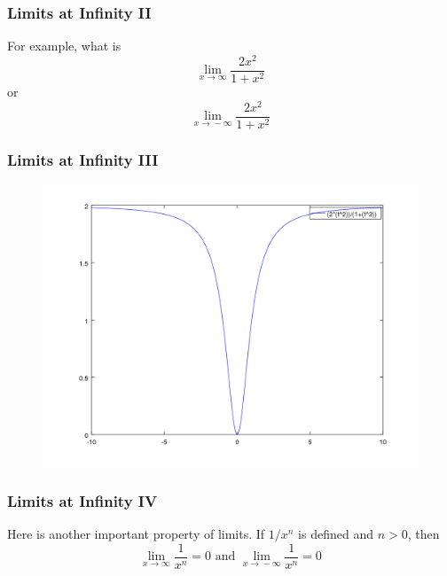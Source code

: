 \documentclass[xcolor=dvipsnames]{beamer}
\begin{document}
\begin{frame}
  \frametitle{Limits at Infinity II}
For example, what is
\begin{equation}
  \label{eq:wingeisa}
  \lim_{x\rightarrow\infty}\frac{2x^{2}}{1+x^{2}}
\end{equation}
or
\begin{equation}
  \label{eq:ahxaibah}
  \lim_{x\rightarrow{}-\infty}\frac{2x^{2}}{1+x^{2}}
\end{equation}
\end{frame}

\begin{frame}
  \frametitle{Limits at Infinity III}
  \begin{figure}[h]
    \includegraphics[scale=.5]{./lai.png}
  \end{figure}
\end{frame}

\begin{frame}
  \frametitle{Limits at Infinity IV}
Here is another important property of limits. If $1/x^{n}$ is defined and $n>0$, then
\begin{equation}
  \label{eq:faingiej}
  \lim_{x\rightarrow{}\infty}\frac{1}{x^{n}}=0\mbox{ and }\lim_{x\rightarrow{}-\infty}\frac{1}{x^{n}}=0
\end{equation}
\end{frame}
\end{document}
